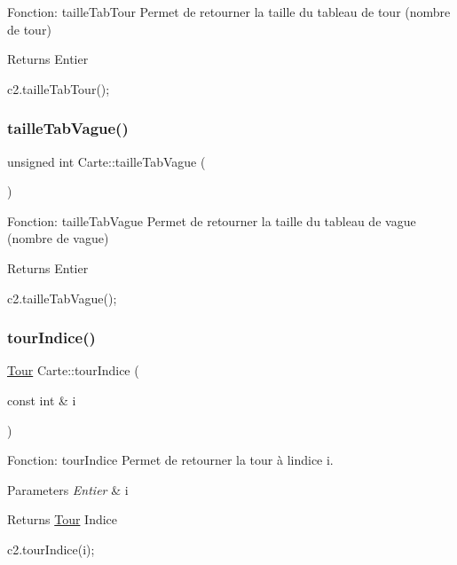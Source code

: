 Fonction\+: taille\+Tab\+Tour Permet de retourner la taille du tableau de tour (nombre de tour) 

\begin{DoxyReturn}{Returns}
Entier 
\begin{DoxyCode}
c2.tailleTabTour();
\end{DoxyCode}
 
\end{DoxyReturn}
\mbox{\label{classCarte_a17cf9a92bb7d81cf3279b50bb40b0891}} 
\subsubsection{\texorpdfstring{taille\+Tab\+Vague()}{tailleTabVague()}}
{\footnotesize\ttfamily unsigned int Carte\+::taille\+Tab\+Vague (\begin{DoxyParamCaption}{ }\end{DoxyParamCaption})}



Fonction\+: taille\+Tab\+Vague Permet de retourner la taille du tableau de vague (nombre de vague) 

\begin{DoxyReturn}{Returns}
Entier 
\begin{DoxyCode}
c2.tailleTabVague();
\end{DoxyCode}
 
\end{DoxyReturn}
\mbox{\label{classCarte_ae4eaa2ff8488218767a9f68232f066d4}} 
\subsubsection{\texorpdfstring{tour\+Indice()}{tourIndice()}}
{\footnotesize\ttfamily \hyperlink{classTour}{Tour} Carte\+::tour\+Indice (\begin{DoxyParamCaption}\item[{const int \&}]{i }\end{DoxyParamCaption})}



Fonction\+: tour\+Indice Permet de retourner la tour à l\textquotesingle{}indice i. 


\begin{DoxyParams}{Parameters}
{\em Entier} & i \\
\hline
\end{DoxyParams}
\begin{DoxyReturn}{Returns}
\hyperlink{classTour}{Tour} Indice 
\begin{DoxyCode}
c2.tourIndice(i);
\end{DoxyCode}
 
\end{DoxyReturn}
\mbox{\label{classCarte_a042044f8d54a0f85953a5f61a0d38c86}} 
